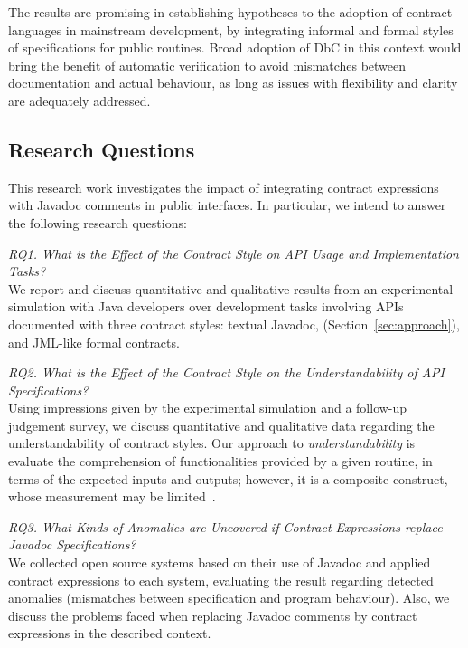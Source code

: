 The results are promising in establishing hypotheses to the adoption of contract languages in mainstream development, by integrating informal and formal styles of specifications for public routines.
Broad adoption of DbC in this context would bring the benefit of automatic verification to avoid mismatches between documentation and actual behaviour, as long as issues with flexibility and clarity are adequately addressed. 


\subsection{Research Questions}
\label{sec:researchQuestions}

This research work investigates the impact of integrating contract expressions with Javadoc comments in public interfaces. 
In particular, we intend to answer the following research questions:  

\noindent\emph{RQ1. What is the Effect of the Contract Style on API Usage and Implementation Tasks?}\\
We report and discuss quantitative and qualitative results from an experimental simulation with Java developers over development tasks involving APIs documented with three contract styles: textual Javadoc, \contractjdoc{} (Section~\ref{sec:approach}), and JML-like formal contracts. 

\noindent\emph{RQ2. What is the Effect of the Contract Style on the Understandability of API Specifications?}\\
Using impressions given by the experimental simulation and a follow-up judgement survey, we discuss quantitative and qualitative data regarding the understandability of contract styles. 
Our approach to \emph{understandability} is evaluate the comprehension of functionalities provided by a given routine, in terms of the expected inputs and outputs; however, it is a composite construct, whose measurement may be limited~\cite{4019969}.


\noindent\emph{RQ3. What Kinds of Anomalies are Uncovered if Contract Expressions replace Javadoc Specifications?}\\
We collected open source systems based on their use of Javadoc and applied contract expressions
to each system, evaluating the result regarding detected anomalies (mismatches between specification and program behaviour). Also, we discuss the problems faced when replacing Javadoc comments by contract expressions in the described context.
